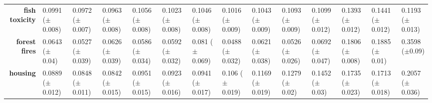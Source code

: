 \begin{sidewaystable}[htbp]
{\begin{tabular}{r|lll|l|l|l|l|l|lllll}
			\textbf{fish toxicity}              & \cellcolor[rgb]{ .588,  .8,  .49}0.0991 ($\pm$0.008)                           & \cellcolor[rgb]{ .451,  .761,  .482}0.0972 ($\pm$0.007) & \cellcolor[rgb]{ .388,  .745,  .482}0.0963 ($\pm$0.008) & \cellcolor[rgb]{ 1,  .91,  .518}0.1056 ($\pm$0.008)     & \cellcolor[rgb]{ .831,  .871,  .506}0.1023 ($\pm$0.008) & \cellcolor[rgb]{ 1,  .922,  .518}0.1046 ($\pm$0.008)    & \cellcolor[rgb]{ .773,  .855,  .502}0.1016 ($\pm$0.009) & \cellcolor[rgb]{ .976,  .914,  .514}0.1043 ($\pm$0.009) & \cellcolor[rgb]{ 1,  .863,  .506}0.1093 ($\pm$0.009)    & \cellcolor[rgb]{ 1,  .855,  .506}0.1099 ($\pm$0.012)    & \cellcolor[rgb]{ .976,  .475,  .435}0.1393 ($\pm$0.012) & \cellcolor[rgb]{ .973,  .412,  .42}0.1441 ($\pm$0.012)  & \cellcolor[rgb]{ .992,  .733,  .482}0.1193 ($\pm$0.013) \\
			\textbf{forest fires}               & \cellcolor[rgb]{ 1,  .922,  .518}0.0643 ($\pm$0.04)                            & \cellcolor[rgb]{ .557,  .792,  .49}0.0527 ($\pm$0.039)  & \cellcolor[rgb]{ 1,  .922,  .518}0.0626 ($\pm$0.039)    & \cellcolor[rgb]{ .824,  .871,  .506}0.0586 ($\pm$0.034) & \cellcolor[rgb]{ .851,  .878,  .506}0.0592 ($\pm$0.032) & \cellcolor[rgb]{ 1,  .89,  .514}0.081 ($\pm$0.069)      & \cellcolor[rgb]{ .388,  .745,  .482}0.0488 ($\pm$0.032) & \cellcolor[rgb]{ .976,  .914,  .514}0.0621 ($\pm$0.038) & \cellcolor[rgb]{ .553,  .792,  .49}0.0526 ($\pm$0.026)  & \cellcolor[rgb]{ 1,  .914,  .518}0.0692 ($\pm$0.047)    & \cellcolor[rgb]{ .992,  .722,  .482}0.1806 ($\pm$0.008) & \cellcolor[rgb]{ .992,  .706,  .478}0.1885 ($\pm$0.01)  & \cellcolor[rgb]{ .973,  .412,  .42}0.3598 ($\pm$0.09)   \\
			\textbf{housing}                    & \cellcolor[rgb]{ .518,  .78,  .486}0.0889 ($\pm$0.012)                         & \cellcolor[rgb]{ .404,  .749,  .482}0.0848 ($\pm$0.011) & \cellcolor[rgb]{ .388,  .745,  .482}0.0842 ($\pm$0.015) & \cellcolor[rgb]{ .69,  .831,  .498}0.0951 ($\pm$0.015)  & \cellcolor[rgb]{ .612,  .808,  .494}0.0923 ($\pm$0.016) & \cellcolor[rgb]{ .663,  .824,  .498}0.0941 ($\pm$0.017) & \cellcolor[rgb]{ 1,  .922,  .518}0.106 ($\pm$0.019)     & \cellcolor[rgb]{ 1,  .867,  .51}0.1169 ($\pm$0.019)     & \cellcolor[rgb]{ .996,  .812,  .498}0.1279 ($\pm$0.02)  & \cellcolor[rgb]{ .992,  .722,  .482}0.1452 ($\pm$0.03)  & \cellcolor[rgb]{ .984,  .576,  .455}0.1735 ($\pm$0.023) & \cellcolor[rgb]{ .984,  .588,  .455}0.1713 ($\pm$0.018) & \cellcolor[rgb]{ .973,  .412,  .42}0.2057 ($\pm$0.036)  \\

\end{tabular}}
\end{sidewaystable}
